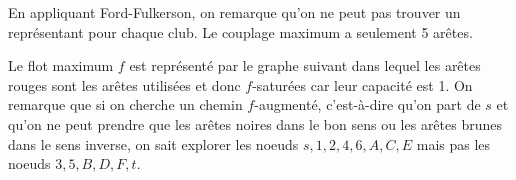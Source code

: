 \begin{solution}
  En appliquant Ford-Fulkerson, on remarque qu'on
  ne peut pas trouver un représentant pour chaque club.
  Le couplage maximum a seulement 5 arêtes.

  Le flot maximum $f$ est représenté par le graphe suivant dans lequel les arêtes rouges sont
  les arêtes utilisées et donc $f$-saturées car leur capacité est 1.
  On remarque que si on cherche un chemin $f$-augmenté,
  c'est-à-dire qu'on part de $s$ et qu'on ne peut prendre que les arêtes noires
  dans le bon sens ou les arêtes brunes dans le sens inverse,
  on sait explorer les noeuds $s,1,2,4,6,A,C,E$ mais pas les noeuds $3,5,B,D,F,t$.
  \begin{center}
  \end{center}
\end{solution}
